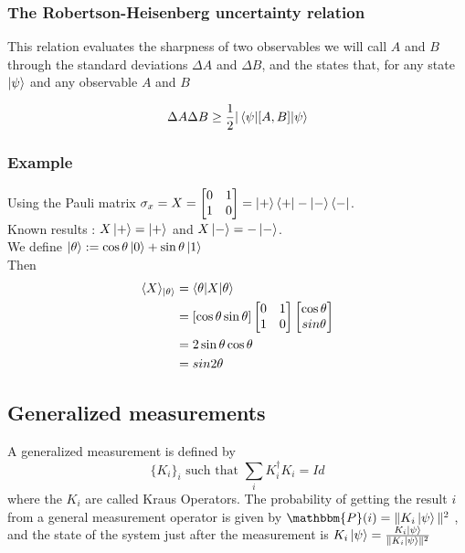 \documentclass{article}
\begin{document}
\subsubsection{The Robertson-Heisenberg uncertainty relation}
This relation evaluates the sharpness of two observables we will call $A$ and $B$ through
the standard deviations $\Delta A$ and $\Delta B$, and the states that, for any state $\ket{\psi}$
and any observable $A$ and $B$

\begin{equation}
    \Delta A \Delta B \geq \frac{1}{2}|\braket{\psi|[A,B]|\psi}
\end{equation}

\subsubsection*{Example}
Using the Pauli matrix $\sigma_x = X =
    \begin{bmatrix}
    0 & 1 \\
    1 & 0
    \end{bmatrix}
    = \ket{+}\bra{+} - \ket{-}\bra{-}
    $.
\\\noindent
Known results : $X\ket{+} = \ket{+}$ and $X\ket{-}=-\ket{-}$.
\\\noindent
We define $\ket{\theta}:=\cos\theta\ket{0}+\sin\theta\ket{1}$
\\\noindent
Then
\begin{equation}
    \begin{aligned}
        \langle X \rangle_{\ket{\theta}}
            & = \braket{\theta | X |\theta} \\
            & = [\cos \theta \sin \theta]
                \begin{bmatrix}0 & 1 \\ 1 & 0 \end{bmatrix}
                \begin{bmatrix} \cos \theta\\ sin \theta \end{bmatrix} \\
            & = 2 \sin\theta\cos\theta \\
            & = sin 2\theta
    \end{aligned}
\end{equation}


\subsection{Generalized measurements}
A generalized measurement is defined by
\begin{equation}
    \{K_i\}_i \text{ such that } \sum_i K_i^\dagger K_i=Id
\end{equation}
where the $K_i$ are called Kraus Operators.
The probability of getting the result $i$ from a general measurement operator is given by
$\mathbbm{P}(i) = \|K_i\ket{\psi}\|^2$
, and the state of the system just after the measurement is $K_i\ket{\psi}=\frac{K_i\ket{\psi}}{\|K_i\ket{\psi}\|^2}$
\end{document}

